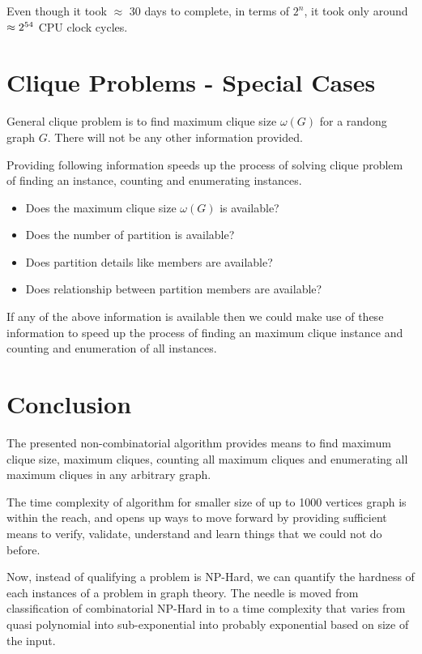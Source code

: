 \documentclass[12pt]{article}
\theoremstyle{plain}
\theoremstyle{definition}
\begin{document}
\subsubsectionbreak
 Even though it took $\approx$ 30 days to complete, in terms of $2^n$, it took only around $\approx 2\textsuperscript{54} $ CPU clock cycles.


\section{Clique Problems - Special Cases}
General clique problem is to find maximum clique size $\omega(G)$ for a randong graph $G$. There will not be any other information provided.

Providing following information speeds up the process of solving clique problem of finding an instance, counting and enumerating instances.

\begin{itemize}
	\setlength{\itemsep}{0pt}
	\setlength{\parskip}{0pt}
	\setlength{\parsep}{0pt}
	\item Does the maximum clique size $\omega(G)$ is available?
	\item Does the number of partition is available?
	\item Does partition details like members are available?
	\item Does relationship between partition members are available?
\end{itemize}

If any of the above information is available then we could make use of these information to speed up the process of finding an maximum clique instance and counting and enumeration of all instances.


\section{Conclusion}

The presented non-combinatorial algorithm provides means to find maximum clique size, maximum cliques, counting all maximum cliques and enumerating all maximum cliques in any arbitrary graph.

The time complexity of algorithm for smaller size of up to 1000 vertices graph is within the reach, and opens up ways to move forward by providing sufficient means to verify, validate, understand and learn things that we could not do before.

Now, instead of qualifying a problem is NP-Hard, we can quantify the hardness of each instances of a problem in graph theory. The needle is moved from classification of combinatorial NP-Hard in to a time complexity that varies from quasi polynomial into sub-exponential into probably exponential based on size of the input.
\end{document}
